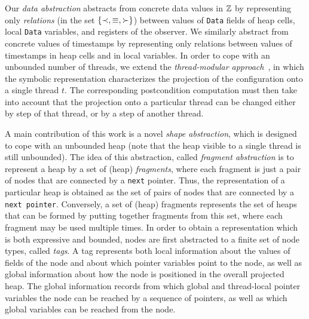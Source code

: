 Our {\em data abstraction} abstracts from concrete data values in
${\mathbb Z}$ by representing only {\em relations}
(in the set $\left\{\prec,\equiv,\succ\right\}$) between values of {\tt Data} fields of 
heap cells, local {\tt Data} variables, and registers of the observer.
We similarly abstract from concrete values of timestamps by representing
only relations between values of timestamps in heap cells and in
local variables.
In order to cope with an unbounded number of threads,
we extend the {\em thread-modular approach}~\cite{BLMRS:cav08}, in which
the symbolic representation characterizes
the projection of the configuration onto a single thread $t$.
The corresponding postcondition computation must then take into account that
the projection onto a particular thread can be changed either by step of that
thread, or by a step of another thread.

A main contribution of this work is 
a novel {\em shape abstraction}, which is designed to cope with an unbounded
heap (note that the heap visible to a single thread is still unbounded).
The idea of this abstraction, called {\em fragment abstraction} is
to represent a heap by a set of (heap) {\em fragments}, where each fragment is
just a pair of nodes that are connected by a {\tt next} pointer. Thus, the
representation of a particular heap is obtained as the set of pairs of nodes
that are connected by a {\tt next pointer}. Conversely,
a set of (heap) fragments represents the set of heaps that can be formed by
putting together fragments from this set, where each fragment may be used
multiple times. In order to obtain a representation which is both expressive
and bounded, nodes are first abstracted to a finite set of node types, called
{\em tags}. A tag represents both local information about the values of
fields of the node
and about which pointer variables point to the node, as well as global
information about how the node is positioned in the overall projected heap.
The global information records from which global and thread-local pointer
variables the node can be reached by a sequence of pointers, as well as
which global variables can be reached from the node.


